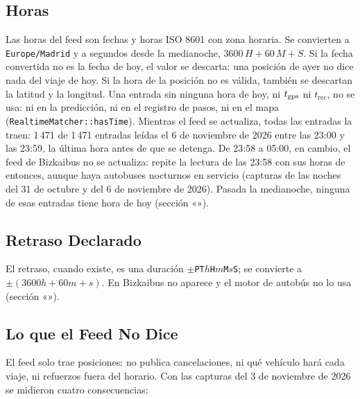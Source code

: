 \subsection{Horas} Las horas del feed son fechas y horas ISO 8601 con zona horaria. Se convierten a
\texttt{Europe/Madrid} y a segundos desde la medianoche, $3600\,H+60\,M+S$. Si la fecha convertida no es la fecha de hoy, el valor se descarta: una posición
de ayer no dice nada del viaje de hoy. Si la hora de la posición no es válida, también se descartan la latitud y la
longitud. Una entrada sin ninguna hora de hoy, ni $t_{\mathrm{gps}}$ ni $t_{\mathrm{rec}}$, no se usa: ni en la predicción, ni en
el registro de pasos, ni en el mapa (\texttt{RealtimeMatcher::hasTime}). Mientras el feed se actualiza, todas las entradas la
traen: 1\,471 de 1\,471 entradas leídas el 6 de noviembre de 2026 entre las 23:00 y las 23:59, la última hora antes de
que se detenga. De 23:58 a 05:00, en cambio, el feed de Bizkaibus no
se actualiza: repite la lectura de las 23:58 con sus horas de entonces, aunque haya autobuses nocturnos en servicio
(capturas de las noches del 31 de octubre y del 6 de noviembre de 2026). Pasada la medianoche, ninguna de esas entradas
tiene hora de hoy (sección «»).

\subsection{Retraso Declarado} El retraso, cuando existe, es una duración $\pm$\texttt{PT}$h$\texttt{H}$m$\texttt{M}$s$\texttt{S};
se convierte a $\pm(3600h+60m+s)$. En Bizkaibus no aparece y el motor de autobús no lo usa
(sección «»).

\subsection{Lo que el Feed No Dice} El feed solo trae posiciones: no publica cancelaciones, ni qué vehículo hará cada
viaje, ni refuerzos fuera del horario. Con las capturas del 3 de noviembre de 2026 se midieron cuatro consecuencias:

